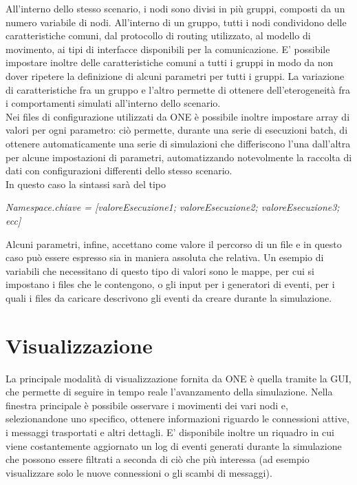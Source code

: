 All'interno dello stesso scenario, i nodi sono divisi in più gruppi, composti da un numero variabile di nodi. All'interno di un gruppo, tutti i nodi condividono delle caratteristiche comuni, dal protocollo di routing utilizzato, al modello di movimento, ai tipi di interfacce disponibili per la comunicazione. E' possibile impostare inoltre delle caratteristiche comuni a tutti i gruppi in modo da non dover ripetere la definizione di alcuni parametri per tutti i gruppi. La variazione di caratteristiche fra un gruppo e l'altro permette di ottenere dell'eterogeneità fra i comportamenti simulati all'interno dello scenario.
\\

Nei files di configurazione utilizzati da ONE è possibile inoltre impostare array di valori per ogni parametro: ciò permette, durante una serie di esecuzioni batch, di ottenere automaticamente una serie di simulazioni che differiscono l'una dall'altra per alcune impostazioni di parametri, automatizzando notevolmente la raccolta di dati con configurazioni differenti dello stesso scenario.
\\ In questo caso la sintassi sarà del tipo

\begin{center}
\textit{Namespace.chiave = [valoreEsecuzione1; valoreEsecuzione2; valoreEsecuzione3; ecc]}
\end{center}

Alcuni parametri, infine, accettano come valore il percorso di un file e in questo caso può essere espresso sia in maniera assoluta che relativa. Un esempio di variabili che necessitano di questo tipo di valori sono le mappe, per cui si impostano i files che le contengono, o gli input per i generatori di eventi, per i quali i files da caricare descrivono gli eventi da creare durante la simulazione.

\section{Visualizzazione}
La principale modalità di visualizzazione fornita da ONE è quella tramite la GUI, che permette di seguire in tempo reale l'avanzamento della simulazione. Nella finestra principale è possibile osservare i movimenti dei vari nodi e, selezionandone uno specifico, ottenere informazioni riguardo le connessioni attive, i messaggi trasportati e altri dettagli. E' disponibile inoltre un riquadro in cui viene costantemente aggiornato un log di eventi generati durante la simulazione che possono essere filtrati a seconda di ciò che più interessa (ad esempio visualizzare solo le nuove connessioni o gli scambi di messaggi).
\\

